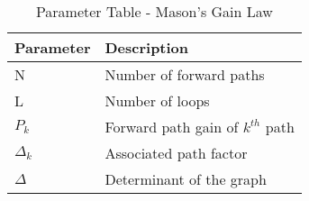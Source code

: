 \begin{table}[!ht] 
\centering
\setlength{\extrarowheight}{8pt}
\begin{tabular}{|l|l|}
    \hline
    \textbf{Parameter} & \textbf{Description}\\
    \hline
     N & Number of forward paths \\\hline
     L & Number of loops\\\hline
     $P_k$ & Forward path gain of $k^{th}$ path\\\hline
     $\Delta_k$ & Associated path factor \\\hline
     $\Delta$ & Determinant of the graph \\\hline
  \end{tabular}
  \vspace{4mm}
 \caption{Parameter Table - Mason's Gain Law}
 \label{tab:table1_ee_22_39}
\end{table}
